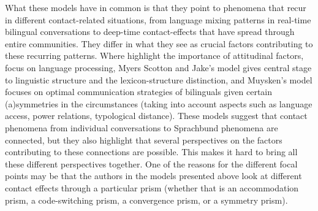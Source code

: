 




\noindent What these models have in common is that they point to phenomena that recur in different contact-related situations, from language mixing patterns in real-time bilingual conversations to deep-time contact-effects that have spread through entire communities. They differ in what they see as crucial factors contributing to these recurring patterns. Where \cite{niedzielskietal1996linguistic} highlight the importance of attitudinal factors, \cite{matras&sakel2007} focus on language processing, Myers Scotton and Jake's \citeyear{myersetal2009universal} model gives central stage to linguistic structure and the lexicon-structure distinction, and Muysken's model focuses on optimal communication strategies of bilinguals given certain (a)symmetries in the circumstances (taking into account aspects such as language access, power relations, typological distance). These models suggest that contact phenomena from individual conversations to Sprachbund phenomena are connected, but they also highlight that several perspectives on the factors contributing to these connections are possible. This makes it hard to bring all these different perspectives together. One of the reasons for the different focal points may be that the authors in the models presented above look at different contact effects through a particular prism (whether that is an accommodation prism, a code-switching prism, a convergence prism, or a symmetry prism). 

